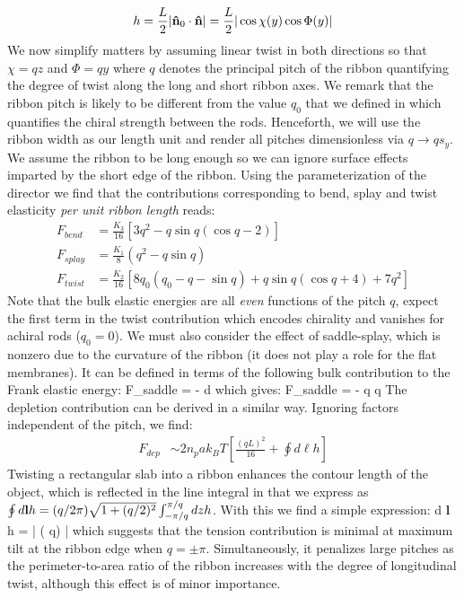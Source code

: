 \begin{align}
h = \frac{L}{2}   | {\bf \hat{n}}_{0} \cdot {\bf \hat{n}} |  =\frac{L}{2} |\cos \chi(y) \cos \Phi(y)| 
\end{align}
We now simplify matters by assuming linear twist in both directions so that $\chi = qz$ and $\Phi = qy$ where $q$ denotes the principal pitch of the ribbon quantifying the degree of twist along the long and short ribbon axes. We remark that the  ribbon pitch is likely to be different from the value $q_{0}$ that we defined in  which quantifies the chiral strength between the rods. Henceforth, we will use the ribbon width as our length unit and render all pitches dimensionless via $q \rightarrow q s_{y}$. We assume the ribbon to be long enough so we can ignore surface effects imparted by the short edge of the ribbon. Using the parameterization of the director  we find that the   contributions corresponding to bend, splay and twist elasticity {\em per unit ribbon length}  reads:
\begin{align}
F_{bend} &=\frac{K_{3}}{16} \left [ 3 q^{2} - q \sin q (\cos q -2)\right ]  \nonumber \\ 
F_{splay} &=  
\frac{K_{1}}{8}  (q^{2}  - q \sin q )  \nonumber \\ 
F_{twist} &=  \frac{K_{2} }{16  }  \left [ 8 q_{0}(q_{0} -q -\sin q)  + q\sin q ( \cos
   q +4) + 7 q^{2}\right ]
\end{align}
Note that the bulk elastic energies   are all {\em even} functions of the pitch $q$, expect the first term in the twist contribution which encodes chirality and vanishes for achiral rods ($q_{0} =0$). 
 We must also consider the effect of saddle-splay, which is nonzero due to the curvature of the ribbon (it does not play a role for the flat membranes). It can be defined in terms of the following bulk contribution to the Frank elastic energy: 
\beq
F_{saddle} = - \int d \bfr   [\nabla \cdot ( \bn \nabla \cdot \bn +  \bn \times \nabla \times \bn )]
\eeq
which gives:
\beq
F_{saddle} = -  q \sin q
\eeq
The depletion contribution  can be derived in a similar way. Ignoring factors independent of the pitch, we find:
\begin{align}
F_{dep}  & \sim  2 n_{p} a k_{B}T \left  [  \frac{(qL)^{2}}{16}  + \oint d \ell h \right ] 
\end{align}
Twisting a rectangular slab into a ribbon enhances the contour length of the object, which is reflected in the line integral in  that we express as $\oint d {\bf l}h = (q/2 \pi)\sqrt{1+ (q/2)^{2}}\int_{-\pi/q}^{\pi/q} dz h$. With this we find a simple expression:
\beq
 \oint d {\bf l} h  =  | \cos  ( q) |     
\eeq
which suggests  that the  tension contribution is minimal at maximum tilt at the ribbon edge when $q = \pm \pi $. Simultaneously, it penalizes large pitches as the perimeter-to-area ratio of the ribbon increases with the degree of longitudinal twist, although this effect is of minor importance.  


